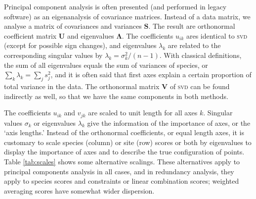 \documentclass[a4paper,10pt,twocolumn]{article}
\begin{document}
Principal component analysis is often presented (and performed in
legacy software) as an eigenanalysis of covariance matrices.  Instead
of a data matrix, we analyse a matrix of covariances and variances
$\mathbf{S}$.  The result are orthonormal coefficient matrix
$\mathbf{U}$ and eigenvalues $\mathbf{\Lambda}$.  The coefficients
$u_{ik}$ ares identical to \textsc{svd} (except for possible sign
changes), and eigenvalues $\lambda_k$ are related to the corresponding
singular values by $\lambda_k = \sigma_k^2 /(n-1)$.  With classical
definitions, the sum of all eigenvalues equals the sum of variances of
species, or $\sum_k \lambda_k = \sum_j s_j^2$, and it is often said
that first axes explain a certain proportion of total variance in the
data.  The orthonormal matrix $\mathbf{V}$ of \textsc{svd} can be
found indirectly as well, so that we have the same components in both
methods.

The coefficients $u_{ik}$ and $v_{jk}$ are scaled to unit length for all
axes $k$. Singular values $\sigma_k$ or eigenvalues $\lambda_k$ give
the information of the importance of axes, or the `axis lengths.'
Instead of the orthonormal coefficients, or equal length axes, it is
customary to scale species (column) or site (row) scores or both by
eigenvalues to display the importance of axes and to describe the true
configuration of points.  Table \ref{tab:scales} shows some
alternative scalings.  These alternatives apply to principal
components analysis in all cases, and in redundancy analysis, they
apply to species scores and constraints or linear combination scores;
weighted averaging scores have somewhat wider dispersion.
\end{document}
